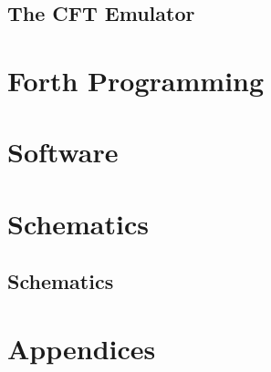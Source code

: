 \ifdefined\renderpartemulator
  \chapter{The CFT Emulator}
  \glsresetall
  \label{chap:emulator}
  
\fi

\ifdefined\renderpartforth
\part{Forth Programming}
  \glsresetall


\fi



\ifdefined\renderpartsoftware
\part{Software}
  \glsresetall


\fi


\ifdefined\renderpartschematics
\part{Schematics}

\chapter{Schematics}
\glsresetall
 
\fi


\ifdefined\renderpartbackmatter
  \appendix
  \part{Appendices}

  \backmatter
  \renewcommand{\thepage}{\roman{page}}

  \glsaddall
  \printglossaries

  \printindex
\fi


